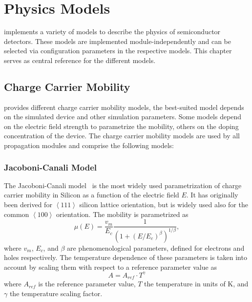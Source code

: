 \chapter{Physics Models}
\label{ch:models}

\apsq implements a variety of models to describe the physics of semiconductor detectors.
These models are implemented module-independently and can be selected via configuration parameters in the respective models.
This chapter serves as central reference for the different models.

\section{Charge Carrier Mobility}
\label{sec:mobility}

\apsq provides different charge carrier mobility models, the best-suited model depends on the simulated device and other simulation parameters.
Some models depend on the electric field strength to parametrize the mobility, others on the doping concentration of the device.
The charge carrier mobility models are used by all propagation modules and comprise the following models:

\subsection{Jacoboni-Canali Model}
\label{sec:mob:jac}

The Jacoboni-Canali model~\cite{jacoboni} is the most widely used parametrization of charge carrier mobility in Silicon as a function of the electric field $E$.
It has originally been derived for $\left<111\right>$ silicon lattice orientation, but is widely used also for the common $\left<100\right>$ orientation.
The mobility is parametrized as
\begin{equation}
    \label{eq:mob:jac}
    \mu (E) = \frac{v_m}{E_c} \frac{1}{\left(1 + (E / E_c)^\beta \right)^{1 / \beta}},
\end{equation}
where $v_m$, $E_c$, and $\beta$ are phenomenological parameters, defined for electrons and holes respectively.
The temperature dependence of these parameters is taken into account by scaling them with respect to a reference parameter value as
\begin{equation}
    A = A_{ref} \cdot T^{\gamma}
\end{equation}
where $A_{ref}$ is the reference parameter value, $T$ the temperature in units of \si{K}, and $\gamma$ the temperature scaling factor.

